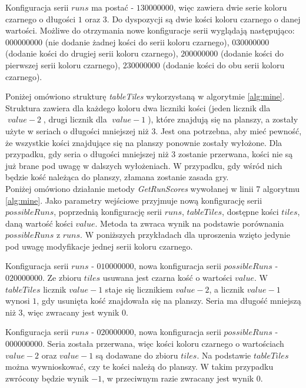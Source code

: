 \begin{example}
Konfiguracja serii $runs$  ma postać - $130000000$, więc zawiera dwie serie koloru czarnego o długości $1$ oraz $3$. Do dyspozycji są dwie kości koloru czarnego o danej wartości. Możliwe do otrzymania nowe konfiguracje serii wyglądają następująco: $000000000$ (nie dodanie żadnej kości do serii koloru czarnego), $030000000$ (dodanie kości do drugiej serii koloru czarnego), $200000000$ (dodanie kości do pierwszej serii koloru czarnego), $230000000$ (dodanie kości do obu serii koloru czarnego). 
\end{example}

Poniżej omówiono strukturę \emph{tableTiles}  wykorzystaną w algorytmie \ref{alg:mine}.
Struktura zawiera dla każdego koloru dwa liczniki kości (jeden licznik dla $\;value-2\;$, drugi licznik dla $\;value-1\;$), które znajdują się na planszy, a zostały użyte w seriach o długości mniejszej niż $3$. Jest ona potrzebna, aby mieć pewność, że wszystkie kości znajdujące się na planszy ponownie zostały wyłożone. Dla przypadku, gdy seria o długości mniejszej niż $3$ zostanie przerwana, kości nie są już brane pod uwagę w dalszych wyłożeniach. W przypadku, gdy wśród nich będzie kość należąca do planszy, złamana zostanie zasada gry. \\

Poniżej omówiono działanie metody \emph{GetRunScores} wywołanej w linii 7 algorytmu \ref{alg:mine}.
Jako parametry wejściowe przyjmuje nową konfigurację serii $possibleRuns$, poprzednią konfigurację serii $runs$, $tableTiles$, dostępne kości $tiles$, daną wartość kości $value$.  
Metoda ta zwraca wynik na podstawie porównania $possibleRuns$ z $runs$. W poniższych przykładach dla uproszenia wzięto jedynie pod uwagę modyfikacje jednej serii koloru czarnego.

\begin{example}
Konfiguracja serii $runs$ - $010000000$, nowa konfiguracja serii $possibleRuns$ - $020000000$. Ze zbioru $tiles$ usuwana jest czarna kość o wartości $value$. W $tableTiles$ licznik $value-1$ staje się licznikiem $value-2$, a licznik $value-1$ wynosi $1$, gdy usunięta kość znajdowała się na planszy. Seria ma długość mniejszą niż 3, więc zwracany jest wynik $0$. 
\end{example}

\begin{example}
Konfiguracja serii $runs$ - $020000000$, nowa konfiguracja serii $possibleRuns$ - $000000000$.
Seria została przerwana, więc kości koloru czarnego o wartościach $value-2$ oraz $value-1$ są dodawane do zbioru $tiles$. Na podstawie $tableTiles$ można wywnioskować, czy te kości należą do planszy. W takim przypadku zwrócony będzie wynik $-1$, w przeciwnym razie zwracany jest wynik $0$. 
\end{example}

